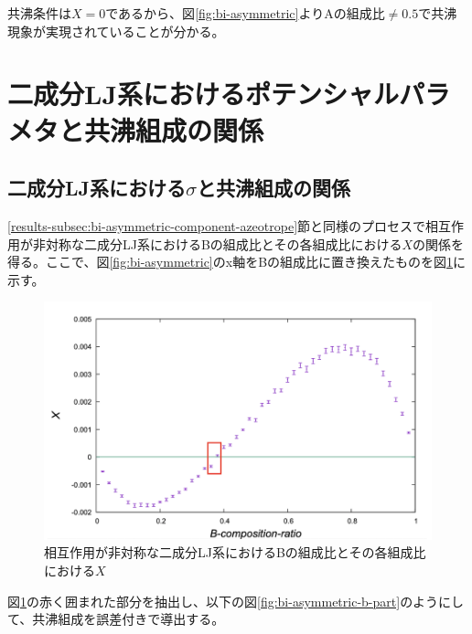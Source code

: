\documentclass[titlepage]{jsreport}
\begin{document}
共沸条件は$X=0$であるから、図\ref{fig:bi-asymmetric}よりAの組成比$\neq0.5$で共沸現象が実現されていることが分かる。

\newpage
\section{二成分LJ系におけるポテンシャルパラメタと共沸組成の関係} \label{results-sec:bi-component-potential-parameter-azeotrope-ratio}
\subsection{二成分LJ系における$\sigma$と共沸組成の関係} \label{results-subsec:bi-component-sigma-azeotrope-ratio}
\ref{results-subsec:bi-asymmetric-component-azeotrope}節と同様のプロセスで相互作用が非対称な二成分LJ系におけるBの組成比とその各組成比における$X$の関係を得る。ここで、図\ref{fig:bi-asymmetric}のx軸をBの組成比に置き換えたものを図\ref{fig:bi-asymmetric-b}に示す。

\begin{figure}[htbp]
    \begin{center}
        \includegraphics[width=14cm]{fig/bi-asymmetric-b/L100T1.0E1.05.pdf}
    \end{center}
    \caption{相互作用が非対称な二成分LJ系におけるBの組成比とその各組成比における$X$}
    \label{fig:bi-asymmetric-b}
\end{figure}

\newpage
図\ref{fig:bi-asymmetric-b}の赤く囲まれた部分を抽出し、以下の図\ref{fig:bi-asymmetric-b-part}のようにして、共沸組成を誤差付きで導出する。
\end{document}
